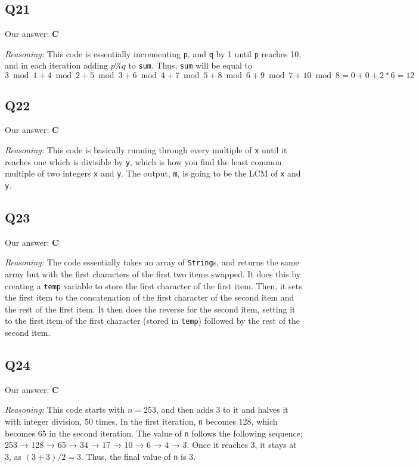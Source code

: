 \documentclass{article}
\begin{document}
\subsection{Q21}

Our answer: \textbf{C}

\noindent\textit{Reasoning:} This code is essentially incrementing  \verb|p|, and \verb|q| by 1 until \verb|p| reaches 10, and in each iteration adding \(p \% q\) to \verb|sum|. Thus, \verb|sum| will be equal to \(3  \bmod  1 + 4  \bmod 2 + 5 \bmod 3 + 6 \bmod 4 + 7 \bmod 5 + 8 \bmod 6 + 9 \bmod 7 + 10 \bmod 8 = 0 + 0 + 2 * 6 = 12\)

\subsection{Q22}

Our answer: \textbf{C}

\noindent\textit{Reasoning:} This code is basically running through every multiple of \verb|x| until it reaches one which is divisible by \verb|y|, which is how you find the least common multiple of two integers \verb|x| and \verb|y|. The output, \verb|m|, is going to be the LCM of \verb|x| and \verb|y|.

\subsection{Q23}

Our answer: \textbf{C}

\noindent\textit{Reasoning:} The code essentially takes an array of \verb|String|s, and returns the same array but with the first characters of the first two items swapped. It does this by creating a \verb|temp| variable to store the first character of the first item. Then, it sets the first item to the concatenation of the first character of the second item and the rest of the first item. It then does the reverse for the second item, setting it to the first item of the first character (stored in \verb|temp|) followed by the rest of the second item.

\subsection{Q24}

Our answer: \textbf{C}

\noindent\textit{Reasoning:} This code starts with \(n = 253\), and then adds 3 to it and halves it with integer division, 50 times. In the first iteration, \verb|n| becomes 128, which becomes 65 in the second iteration. The value of \verb|n| follows the following sequence: 253 → 128 → 65 → 34 → 17 → 10 → 6 → 4 → 3. Once it reaches 3, it stays at 3, as \((3 + 3) / 2 = 3\). Thus, the final value of \verb|n| is 3.
\end{document}
